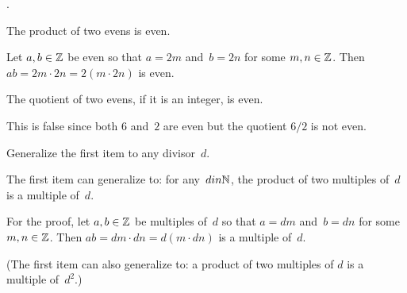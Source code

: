 \documentclass{test}  %
\begin{document}
\begin{problem} 
\pord.
\begin{exes}
\begin{exercise}
  The product of two evens is even.
\end{exercise}
\begin{answer}
  Let $a,b\in\mathbb{Z}$ be even
  so that $a=2m$ and~$b=2n$ for some $m,n\in\mathbb{Z}$.
  Then $ab=2m\cdot 2n=2(m\cdot 2n)$ is even.  
\end{answer}

\begin{exercise}
  The quotient of two evens, if it is an integer, is even.
\end{exercise}
\begin{answer}
  This is false since both $6$ and~$2$ are even but the quotient $6/2$
  is not even.
\end{answer}

\begin{exercise}
  Generalize the first item to any divisor~$d$.  
\end{exercise}
\begin{answer}
  The first item can generalize to: for any~$din\mathbb{N}$, 
  the product of two multiples of~$d$ is a multiple of~$d$.

  For the proof,  let $a,b\in\mathbb{Z}$ be multiples of~$d$
  so that $a=dm$ and~$b=dn$ for some $m,n\in\mathbb{Z}$.
  Then $ab=dm\cdot dn=d(m\cdot dn)$ is a multiple of~$d$.

  (The first item can also generalize to: a product of two multiples of
  $d$ is a multiple of~$d^2$.)
\end{answer}


\end{exes}
\end{problem}
\end{document}
